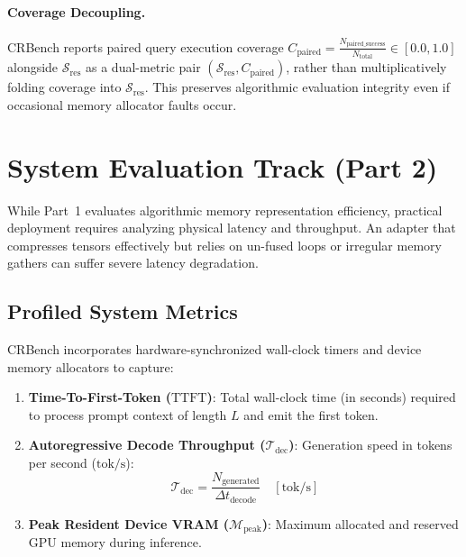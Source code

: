 \documentclass[10pt]{article}
\theoremstyle{definition}
\begin{document}
\paragraph{Coverage Decoupling.} CRBench reports paired query execution coverage $C_{\text{paired}} = \frac{N_{\text{paired\_success}}}{N_{\text{total}}} \in [0.0, 1.0]$ alongside $\mathcal{S}_{\text{res}}$ as a dual-metric pair $(\mathcal{S}_{\text{res}}, C_{\text{paired}})$, rather than multiplicatively folding coverage into $\mathcal{S}_{\text{res}}$. This preserves algorithmic evaluation integrity even if occasional memory allocator faults occur.

\section{System Evaluation Track (Part 2)}
\label{sec:system}

While Part~1 evaluates algorithmic memory representation efficiency, practical deployment requires analyzing physical latency and throughput. An adapter that compresses tensors effectively but relies on un-fused loops or irregular memory gathers can suffer severe latency degradation.

\subsection{Profiled System Metrics}
CRBench incorporates hardware-synchronized wall-clock timers and device memory allocators to capture:
\begin{enumerate}[leftmargin=*,itemsep=1.0pt]
    \item \textbf{Time-To-First-Token ($\text{TTFT}$)}: Total wall-clock time (in seconds) required to process prompt context of length $L$ and emit the first token.
    \item \textbf{Autoregressive Decode Throughput ($\mathcal{T}_{\text{dec}}$)}: Generation speed in tokens per second ($\text{tok/s}$):
    \begin{equation}
    \label{eq:throughput}
    \mathcal{T}_{\text{dec}} = \frac{N_{\text{generated}}}{\Delta t_{\text{decode}}} \quad [\text{tok/s}]
    \end{equation}
    \item \textbf{Peak Resident Device VRAM ($\mathcal{M}_{\text{peak}}$)}: Maximum allocated and reserved GPU memory during inference.
\end{enumerate}
\end{document}
